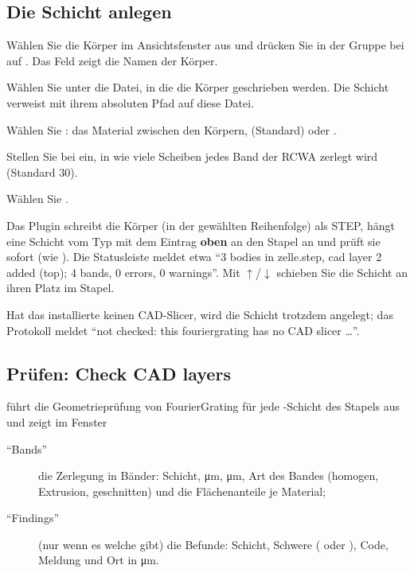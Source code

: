 \subsection{Die Schicht anlegen}

\begin{schritte}
  \item Wählen Sie die Körper im Ansichtsfenster aus und drücken Sie in der Gruppe 
    bei  auf . Das Feld zeigt die Namen der Körper.
  \item Wählen Sie unter  die Datei, in die die Körper geschrieben werden. Die Schicht
    verweist mit ihrem absoluten Pfad auf diese Datei.
  \item Wählen Sie : das Material zwischen den Körpern, 
    (Standard) oder .
  \item Stellen Sie bei  ein, in wie viele Scheiben jedes Band der
    RCWA zerlegt wird (Standard 30).
  \item Wählen Sie .
\end{schritte}

Das Plugin schreibt die Körper (in der gewählten Reihenfolge) als STEP, hängt eine Schicht vom Typ
 mit dem Eintrag  \textbf{oben} an den Stapel an und prüft sie
sofort (wie ). Die Statusleiste meldet etwa \enquote{3 bodies in
zelle.step, cad layer 2 added (top); 4 bands, 0 errors, 0 warnings}. Mit $\uparrow$/$\downarrow$
schieben Sie die Schicht an ihren Platz im Stapel.

Hat das installierte  keinen CAD-Slicer, wird die Schicht trotzdem angelegt;
das Protokoll meldet \enquote{not checked: this fouriergrating has no CAD slicer …}.

\subsection{Prüfen: Check CAD layers}

 führt die Geometrieprüfung von FourierGrating für jede -Schicht des
Stapels aus und zeigt im Fenster 

\begin{description}
  \item[\enquote{Bands}] die Zerlegung in Bänder: Schicht, \si{\micro\metre}, \si{\micro\metre},
    Art des Bandes (homogen, Extrusion, geschnitten) und die Flächenanteile je Material;
  \item[\enquote{Findings}] (nur wenn es welche gibt) die Befunde: Schicht, Schwere (
    oder ), Code, Meldung und Ort in \si{\micro\metre}.
\end{description}

